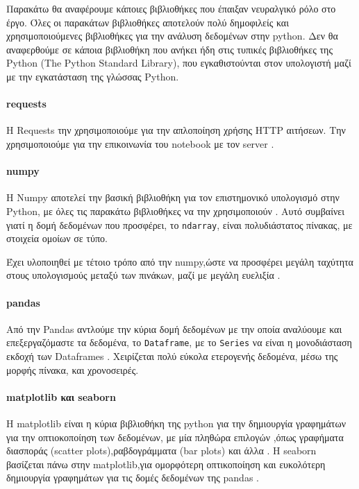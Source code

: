 Παρακάτω θα αναφέρουμε κάποιες βιβλιοθήκες που έπαιξαν νευραλγικό ρόλο στο έργο.
Όλες οι παρακάτων βιβλιοθήκες αποτελούν πολύ δημοφιλείς και χρησιμοποιούμενες βιβλιοθήκες για την ανάλυση δεδομένων στην python.
Δεν θα αναφερθούμε σε κάποια βιβλιοθήκη που ανήκει ήδη στις τυπικές βιβλιοθήκες της Python (The Python Standard Library),
που εγκαθιστούνται στον υπολογιστή μαζί με την εγκατάσταση της γλώσσας Python.

\paragraph{requests}
H Requests την χρησιμοποιούμε για την απλοποίηση χρήσης HTTP αιτήσεων.
Την χρησιμοποιούμε για την επικοινωνία του notebook με τον server \cite{requests}.

\paragraph{numpy}
Η Numpy αποτελεί την βασική βιβλιοθήκη για τον επιστημονικό υπολογισμό στην Python,
με όλες τις παρακάτω βιβλιοθήκες να την χρησιμοποιούν .
Αυτό συμβαίνει γιατί η δομή δεδομένων που προσφέρει, το \texttt{ndarray},
είναι πολυδιάστατος πίνακας, με στοιχεία ομοίων σε τύπο.

Έχει υλοποιηθεί με τέτοιο  τρόπο από την numpy,ώστε να προσφέρει μεγάλη ταχύτητα στους υπολογισμούς μεταξύ των πινάκων, μαζί με μεγάλη ευελιξία \cite{numpy}.

\paragraph{pandas}

Από την Pandas αντλούμε την κύρια δομή δεδομένων 
με την οποία αναλύουμε και επεξεργαζόμαστε τα δεδομένα, το \texttt{Dataframe},
με το \texttt{Series} να είναι η μονοδιάσταση εκδοχή των Dataframes \cite{pandas}.
Χειρίζεται πολύ εύκολα ετερογενής δεδομένα, μέσω της μορφής πίνακα, και χρονοσειρές.

\paragraph{matplotlib και seaborn}

Η matplotlib είναι η κύρια βιβλιοθήκη της python για την δημιουργία γραφημάτων για την οπτιοκοποίηση των δεδομένων,
με μία πληθώρα επιλογών ,όπως γραφήματα διασποράς (scatter plots),ραβδογράμματα (bar plots) και άλλα \cite{matplotlib}.
Η seaborn βασίζεται πάνω στην matplotlib,για ομορφότερη οπτικοποίηση και ευκολότερη δημιουργία γραφημάτων
για τις δομές δεδομένων της pandas \cite{seaborn}. 

